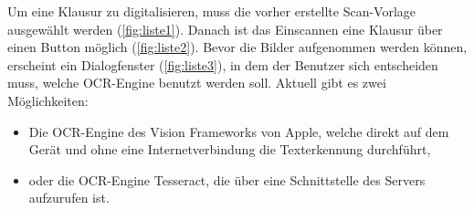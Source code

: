 \documentclass[notables, nomenclature, oneside, 150]{HSMW-Thesis}
\begin{document}
			Um eine Klausur zu digitalisieren, muss die vorher erstellte Scan-Vorlage ausgewählt werden (\ref{fig:liste1}). Danach ist das Einscannen eine Klausur über einen Button möglich (\ref{fig:liste2}). Bevor die Bilder aufgenommen werden können, erscheint ein Dialogfenster (\ref{fig:liste3}), in dem der Benutzer sich entscheiden muss, welche OCR-Engine benutzt werden soll. Aktuell gibt es zwei Möglichkeiten:
			\vspace{-5mm}
			\begin{itemize}
				\item Die OCR-Engine des Vision Frameworks von Apple, welche direkt auf dem Gerät und ohne eine Internetverbindung die Texterkennung durchführt,  
				\item oder die OCR-Engine Tesseract, die über eine Schnittstelle des Servers aufzurufen ist.
			\end{itemize}
				
\end{document}
